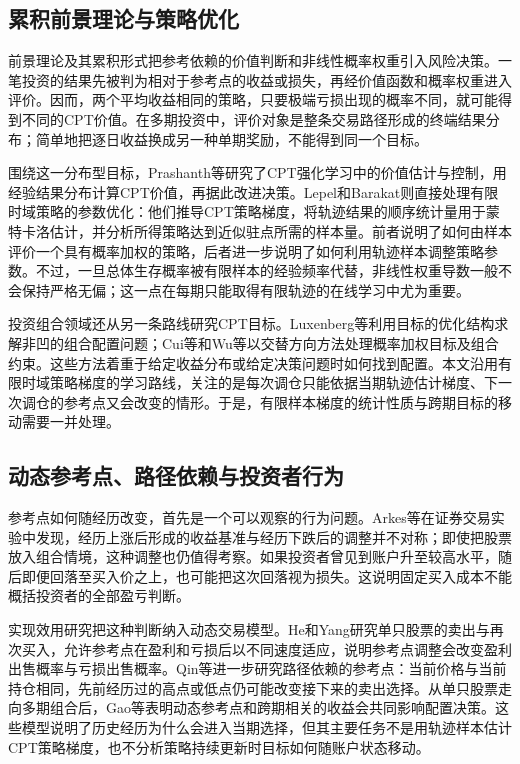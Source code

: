 \subsection{累积前景理论与策略优化}

前景理论及其累积形式把参考依赖的价值判断和非线性概率权重引入风险决策\citep{kahneman1979prospect,tversky1992advances}。一笔投资的结果先被判为相对于参考点的收益或损失，再经价值函数和概率权重进入评价。因而，两个平均收益相同的策略，只要极端亏损出现的概率不同，就可能得到不同的CPT价值。在多期投资中，评价对象是整条交易路径形成的终端结果分布；简单地把逐日收益换成另一种单期奖励，不能得到同一个目标。

围绕这一分布型目标，Prashanth等研究了CPT强化学习中的价值估计与控制，用经验结果分布计算CPT价值，再据此改进决策\citep{prashanth2016cumulative}。Lepel和Barakat则直接处理有限时域策略的参数优化：他们推导CPT策略梯度，将轨迹结果的顺序统计量用于蒙特卡洛估计，并分析所得策略达到近似驻点所需的样本量\citep{lepel2026policygradients}。前者说明了如何由样本评价一个具有概率加权的策略，后者进一步说明了如何利用轨迹样本调整策略参数。不过，一旦总体生存概率被有限样本的经验频率代替，非线性权重导数一般不会保持严格无偏；这一点在每期只能取得有限轨迹的在线学习中尤为重要。

投资组合领域还从另一条路线研究CPT目标。Luxenberg等利用目标的优化结构求解非凹的组合配置问题\citep{luxenberg2024portfolio}；Cui等和Wu等以交替方向方法处理概率加权目标及组合约束\citep{cui2025decision,wu2026behavioral}。这些方法着重于给定收益分布或给定决策问题时如何找到配置。本文沿用有限时域策略梯度的学习路线，关注的是每次调仓只能依据当期轨迹估计梯度、下一次调仓的参考点又会改变的情形。于是，有限样本梯度的统计性质与跨期目标的移动需要一并处理。

\subsection{动态参考点、路径依赖与投资者行为}

参考点如何随经历改变，首先是一个可以观察的行为问题。Arkes等在证券交易实验中发现，经历上涨后形成的收益基准与经历下跌后的调整并不对称；即使把股票放入组合情境，这种调整也仍值得考察\citep{arkes2008reference}。如果投资者曾见到账户升至较高水平，随后即便回落至买入价之上，也可能把这次回落视为损失。这说明固定买入成本不能概括投资者的全部盈亏判断。

实现效用研究把这种判断纳入动态交易模型。He和Yang研究单只股票的卖出与再次买入，允许参考点在盈利和亏损后以不同速度适应，说明参考点调整会改变盈利出售概率与亏损出售概率\citep{he2019realization}。Qin等进一步研究路径依赖的参考点：当前价格与当前持仓相同，先前经历过的高点或低点仍可能改变接下来的卖出选择\citep{qin2022realization}。从单只股票走向多期组合后，Gao等表明动态参考点和跨期相关的收益会共同影响配置决策\citep{gao2024multiperiod}。这些模型说明了历史经历为什么会进入当期选择，但其主要任务不是用轨迹样本估计CPT策略梯度，也不分析策略持续更新时目标如何随账户状态移动。

